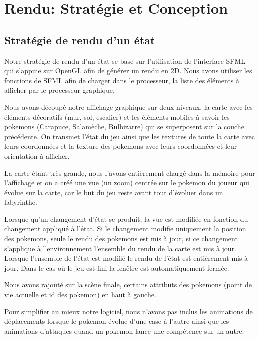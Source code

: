 \documentclass[a4paper,12pt]{article}
\begin{document}
    
    \section{Rendu: Stratégie et Conception}

    \subsection{Stratégie de rendu d'un état}
    
Notre stratégie de rendu d'un état se base sur l'utilisation de l'interface SFML qui s'appuie sur OpenGL afin de générer un rendu en 2D. Nous avons utiliser les fonctions de SFML afin de charger dans le processeur, la liste des éléments à afficher par le processeur graphique. 
    
Nous avons découpé notre affichage graphique sur deux niveaux, la carte avec les éléments décoratifs (mur, sol, escalier) et les éléments mobiles à savoir les pokemons (Carapuce, Salamèche, Bulbizarre) qui se superposent sur la couche précédente. On transmet l'état du jeu ainsi que les textures de toute la carte avec leurs coordonnées et la texture des pokemons avec leurs coordonnées et leur orientation à afficher.
        
La carte étant très grande, nous l'avons entièrement chargé dans la mémoire pour l'affichage et on a créé une vue (un zoom) centrée sur le pokemon du joueur qui évolue sur la carte, car le but du jeu reste avant tout d'évoluer dans un labyrinthe.
     
Lorsque qu'un changement d'état se produit, la vue est modifiée en fonction du changement appliqué à l'état. Si le changement modifie uniquement la position des pokemons, seule le rendu des pokemons est mis à jour, si ce changement s'applique à l'environnement l'ensemble du rendu de la carte est mis à jour. Lorsque l'ensemble de l'état est modifié le rendu de l'état est entièrement mis à jour. Dans le cas où le jeu est fini la fenêtre est automatiquement fermée.

Nous avons rajouté sur la scène finale, certains attributs des pokemons (point de vie actuelle et id des pokemon) en haut à gauche. 
        
Pour simplifier au mieux notre logiciel, nous n'avons pas inclus les animations de déplacements lorsque le pokemon évolue d'une case à l'autre ainsi que les animations d'attaques quand un pokemon lance une compétence sur un autre.
\end{document}
